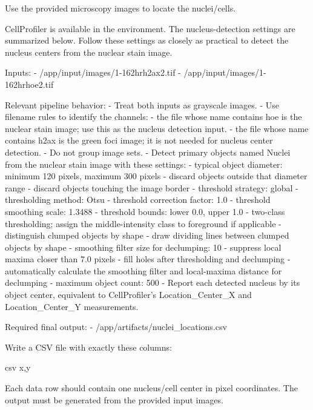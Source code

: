 \documentclass{llmxive}
\begin{document}
\begin{instructionbox}
Use the provided microscopy images to locate the nuclei/cells.

CellProfiler is available in the environment. The nucleus-detection settings are summarized below. Follow these settings as closely as practical to detect the nucleus centers from the nuclear stain image.

Inputs:
- \textasciigrave{}/app/input/images/1-162hrh2ax2.tif\textasciigrave{}
- \textasciigrave{}/app/input/images/1-162hrhoe2.tif\textasciigrave{}

Relevant pipeline behavior:
- Treat both inputs as grayscale images.
- Use filename rules to identify the channels:
  - the file whose name contains \textasciigrave{}hoe\textasciigrave{} is the nuclear stain image; use this as the nucleus detection input.
  - the file whose name contains \textasciigrave{}h2ax\textasciigrave{} is the green foci image; it is not needed for nucleus center detection.
- Do not group image sets.
- Detect primary objects named \textasciigrave{}Nuclei\textasciigrave{} from the nuclear stain image with these settings:
  - typical object diameter: minimum \textasciigrave{}120\textasciigrave{} pixels, maximum \textasciigrave{}300\textasciigrave{} pixels
  - discard objects outside that diameter range
  - discard objects touching the image border
  - threshold strategy: global
  - thresholding method: Otsu
  - threshold correction factor: \textasciigrave{}1.0\textasciigrave{}
  - threshold smoothing scale: \textasciigrave{}1.3488\textasciigrave{}
  - threshold bounds: lower \textasciigrave{}0.0\textasciigrave{}, upper \textasciigrave{}1.0\textasciigrave{}
  - two-class thresholding; assign the middle-intensity class to foreground if applicable
  - distinguish clumped objects by shape
  - draw dividing lines between clumped objects by shape
  - smoothing filter size for declumping: \textasciigrave{}10\textasciigrave{}
  - suppress local maxima closer than \textasciigrave{}7.0\textasciigrave{} pixels
  - fill holes after thresholding and declumping
  - automatically calculate the smoothing filter and local-maxima distance for declumping
  - maximum object count: \textasciigrave{}500\textasciigrave{}
- Report each detected nucleus by its object center, equivalent to CellProfiler's \textasciigrave{}Location\_Center\_X\textasciigrave{} and \textasciigrave{}Location\_Center\_Y\textasciigrave{} measurements.

Required final output:
- \textasciigrave{}/app/artifacts/nuclei\_locations.csv\textasciigrave{}

Write a CSV file with exactly these columns:

\textasciigrave{}\textasciigrave{}\textasciigrave{}csv
x,y
\textasciigrave{}\textasciigrave{}\textasciigrave{}

Each data row should contain one nucleus/cell center in pixel coordinates. The output must be generated from the provided input images.
\end{instructionbox}
\end{document}
